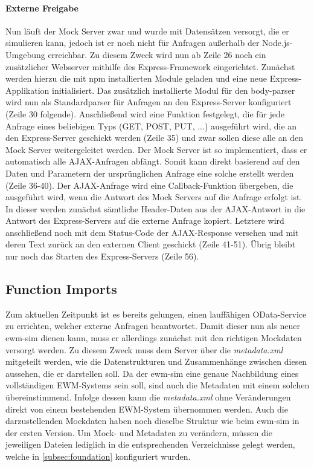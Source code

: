 \paragraph{Externe Freigabe}
Nun läuft der Mock Server zwar und wurde mit Datensätzen versorgt, die er simulieren kann, jedoch ist er noch nicht für Anfragen außerhalb der Node.js-Umgebung erreichbar.
Zu diesem Zweck wird nun ab Zeile 26 noch ein zusätzlicher Webserver mithilfe des Express-Framework eingerichtet.
Zunächst werden hierzu die mit \ac{npm} installierten Module geladen und eine neue Express-Applikation initialisiert.
Das zusätzlich installierte Modul für den body-parser wird nun als Standardparser für Anfragen an den Express-Server konfiguriert (Zeile 30 folgende).
Anschließend wird eine Funktion festgelegt, die für jede Anfrage eines beliebigen Typs (GET, POST, PUT, ...) ausgeführt wird, die an den Express-Server geschickt werden (Zeile 35) und zwar sollen diese alle an den Mock Server weitergeleitet werden.
Der Mock Server ist so implementiert, dass er automatisch alle \ac{AJAX}-Anfragen abfängt.
Somit kann direkt basierend auf den Daten und Parametern der ursprünglichen Anfrage eine solche erstellt werden (Zeile 36-40).
Der \ac{AJAX}-Anfrage wird eine Callback-Funktion übergeben, die ausgeführt wird, wenn die Antwort des Mock Servers auf die Anfrage erfolgt ist.
In dieser werden zunächst sämtliche Header-Daten aus der \ac{AJAX}-Antwort in die Antwort des Express-Servers auf die externe Anfrage kopiert.
Letztere wird anschließend noch mit dem Status-Code der \ac{AJAX}-Response versehen und mit deren Text zurück an den externen Client geschickt (Zeile 41-51).
Übrig bleibt nur noch das Starten des Express-Servers (Zeile 56).


\subsection{Function Imports}
Zum aktuellen Zeitpunkt ist es bereits gelungen, einen lauffähigen OData-Service zu errichten, welcher externe Anfragen beantwortet.
Damit dieser nun als neuer \ac{ewm-sim} dienen kann, muss er allerdings zunächst mit den richtigen Mockdaten versorgt werden.
Zu diesem Zweck muss dem Server über die \emph{metadata.xml} mitgeteilt werden, wie die Datenstrukturen und Zusammenhänge zwischen diesen aussehen, die er darstellen soll.
Da der \ac{ewm-sim} eine genaue Nachbildung eines vollständigen \ac{EWM}-Systems sein soll, sind auch die Metadaten mit einem solchen übereinstimmend.
Infolge dessen kann die \emph{metadata.xml} ohne Veränderungen direkt von einem bestehenden \ac{EWM}-System übernommen werden.
Auch die darzustellenden Mockdaten haben noch dieselbe Struktur wie beim \ac{ewm-sim} in der ersten Version.
Um Mock- und Metadaten zu verändern, müssen die jeweiligen Dateien lediglich in die entsprechenden Verzeichnisse gelegt werden, welche in \autoref{subsec:foundation} konfiguriert wurden.

